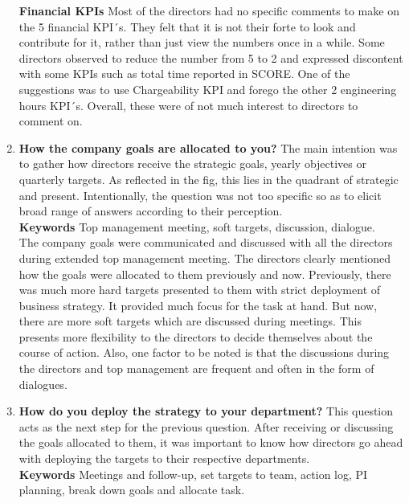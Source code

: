 \begin{enumerate}
\textbf{Financial KPIs} Most of the directors had no specific comments to make on the 5 financial KPI´s. They felt that it is not their forte to look and contribute for it, rather than just view the numbers once in a while. Some directors observed to reduce the number from 5 to 2 and expressed discontent with some KPIs such as total time reported in SCORE. One of the suggestions was to use Chargeability KPI and forego the other 2 engineering hours KPI´s. Overall, these were of not much interest to directors to comment on.\\

\item \textbf{How the company goals are allocated to you?}
The main intention was to gather how directors receive the strategic goals, yearly objectives or quarterly targets. As reflected in the fig, this lies in the quadrant of strategic and present. Intentionally, the question was not too specific so as to elicit broad range of answers according to their perception.\\

\textbf{Keywords} Top management meeting, soft targets, discussion, dialogue.\\

The company goals were communicated and discussed with all the directors during extended top management meeting. The directors clearly mentioned how the goals were allocated to them previously and now. Previously, there was much more hard targets presented to them with strict deployment of business strategy. It provided much focus for the task at hand. But now, there are more soft targets which are discussed during meetings. This presents more flexibility to the directors to decide themselves about the course of action. Also, one factor to be noted is that the discussions during the directors and top management are frequent and often in the form of dialogues.\\

\item \textbf{How do you deploy the strategy to your department?}
This question acts as the next step for the previous question. After receiving or discussing the goals allocated to them, it was important to know how directors go ahead with deploying the targets to their respective departments.\\

\textbf{Keywords} Meetings and follow-up, set targets to team, action log, PI planning, break down goals and allocate task.\\


\end{enumerate}
